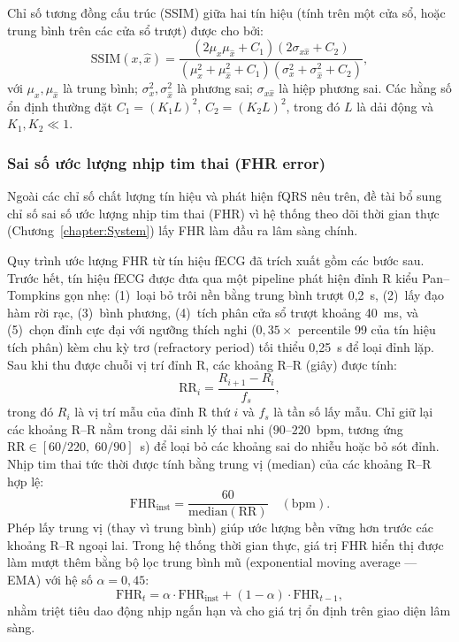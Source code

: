 \documentclass[../DoAn.tex]{subfiles}
\begin{document}
Chỉ số tương đồng cấu trúc (SSIM) giữa hai tín hiệu (tính trên một cửa sổ, hoặc trung bình trên các cửa sổ trượt) được cho bởi:
\begin{equation}
\mathrm{SSIM}(x,\hat{x})=
\frac{(2\mu_x\mu_{\hat{x}}+C_1)(2\sigma_{x\hat{x}}+C_2)}
{(\mu_x^2+\mu_{\hat{x}}^2+C_1)(\sigma_x^2+\sigma_{\hat{x}}^2+C_2)},
\end{equation}
với $\mu_x,\mu_{\hat{x}}$ là trung bình; $\sigma_x^2,\sigma_{\hat{x}}^2$ là phương sai; $\sigma_{x\hat{x}}$ là hiệp phương sai.
Các hằng số ổn định thường đặt $C_1=(K_1L)^2$, $C_2=(K_2L)^2$, trong đó $L$ là dải động và $K_1,K_2\ll 1$.

\subsubsection{Sai số ước lượng nhịp tim thai (FHR error)}

Ngoài các chỉ số chất lượng tín hiệu và phát hiện fQRS nêu trên, đề tài bổ sung chỉ số sai số ước lượng nhịp tim thai (FHR) vì hệ thống theo dõi thời gian thực (Chương~\ref{chapter:System}) lấy FHR làm đầu ra lâm sàng chính.

Quy trình ước lượng FHR từ tín hiệu fECG đã trích xuất gồm các bước sau. Trước hết, tín hiệu fECG được đưa qua một pipeline phát hiện đỉnh R kiểu Pan--Tompkins gọn nhẹ: (1)~loại bỏ trôi nền bằng trung bình trượt 0{,}2~s, (2)~lấy đạo hàm rời rạc, (3)~bình phương, (4)~tích phân cửa sổ trượt khoảng 40~ms, và (5)~chọn đỉnh cực đại với ngưỡng thích nghi ($0{,}35 \times$ percentile 99 của tín hiệu tích phân) kèm chu kỳ trơ (refractory period) tối thiểu 0{,}25~s để loại đỉnh lặp. Sau khi thu được chuỗi vị trí đỉnh R, các khoảng R--R (giây) được tính:
\begin{equation}
  \mathrm{RR}_i = \frac{R_{i+1} - R_i}{f_s},
\end{equation}
trong đó $R_i$ là vị trí mẫu của đỉnh R thứ $i$ và $f_s$ là tần số lấy mẫu. Chỉ giữ lại các khoảng R--R nằm trong dải sinh lý thai nhi ($90$--$220$~bpm, tương ứng $\mathrm{RR} \in [60/220,\; 60/90]$~s) để loại bỏ các khoảng sai do nhiễu hoặc bỏ sót đỉnh. Nhịp tim thai tức thời được tính bằng trung vị (median) của các khoảng R--R hợp lệ:
\begin{equation}
  \mathrm{FHR}_{\text{inst}} = \frac{60}{\mathrm{median}(\mathrm{RR})}\quad (\text{bpm}).
\end{equation}
Phép lấy trung vị (thay vì trung bình) giúp ước lượng bền vững hơn trước các khoảng R--R ngoại lai. Trong hệ thống thời gian thực, giá trị FHR hiển thị được làm mượt thêm bằng bộ lọc trung bình mũ (exponential moving average --- EMA) với hệ số $\alpha = 0{,}45$:
\begin{equation}
  \mathrm{FHR}_{t} = \alpha \cdot \mathrm{FHR}_{\text{inst}} + (1 - \alpha) \cdot \mathrm{FHR}_{t-1},
\end{equation}
nhằm triệt tiêu dao động nhịp ngắn hạn và cho giá trị ổn định trên giao diện lâm sàng.
\end{document}
